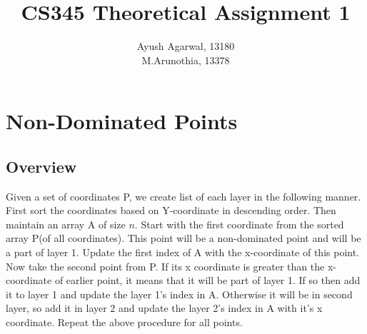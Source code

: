 \documentclass{article}
\title{CS345 Theoretical Assignment 1 \\ }
\author{\vspace{2mm} \large Ayush Agarwal, 13180 \\ M.Arunothia, 13378}
\date{}
\begin{document}
\maketitle
\tableofcontents
\newpage
\section{Non-Dominated Points}
\subsection{Overview}
Given a set of coordinates P, we create list of each layer in the following manner.\\
First sort the coordinates based on Y-coordinate in descending order. Then maintain an array A of size $n$. Start with the first coordinate from 
the sorted array P(of all coordinates). This point will be a non-dominated point and will be a part of layer 1. Update the first index of A with the x-coordinate
of this point. Now take the second point from P. If its x coordinate is greater than the x-coordinate of earlier point, it means that it will be part of layer
1. If so then add it to layer 1 and update the layer 1's index in A. Otherwise it will be in second layer, so add it in layer 2 and update the layer 2's index 
in A with it's x coordinate. Repeat the above procedure for all points.
\end{document}
